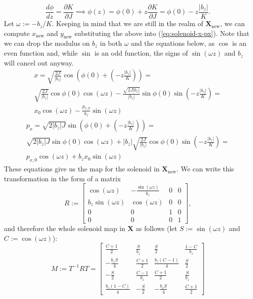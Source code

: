 \[
  \frac{d \phi}{d z} = \frac{\partial K}{\partial J} \implies \phi(z) = \phi(0) + z \frac{\partial K}{\partial J} = \phi(0) - z\frac{|b_z|}{K}.
\]
Let $\omega := -b_z / K$. Keeping in mind that we are still in the realm of $\mathbf{X}_\text{new}$, we can compute $x_\text{new}$ and $y_\text{new}$ substituting the above into (\ref{eq:solenoid-x-px}).
Note that we can drop the modulus on $b_z$ in both $\omega$ and the equations below, as $\cos$ is an even function and, while $\sin$ is an odd function, the signs of $\sin(\omega z)$ and $b_z$ will cancel out anyway.
\begin{multline*}
  x = \sqrt{\frac{2J}{|b_z|}} \cos\left(\phi(0) + \left(- z\frac{|b_z|}{K}\right)\right) = \\
    \sqrt{\frac{2J}{|b_z|}} \cos\phi(0) \cos(\omega z) - \frac{\sqrt{2J|b_z|}}{|b_z|} \sin\phi(0) \sin\left(- z\frac{|b_z|}{K}\right) = \\
    x_0 \cos(\omega z) - \frac{p_{x,0}}{b_z} \sin(\omega z)
\end{multline*}
\begin{multline*}
  p_x = \sqrt{2 |b_z| J} \sin\left(\phi(0) + \left(- z\frac{|b_z|}{K}\right)\right) = \\
    \sqrt{2 |b_z| J} \sin\phi(0) \cos(\omega z) + |b_z| \sqrt{\frac{2J}{|b_z|}} \cos\phi(0) \sin\left(- z\frac{|b_z|}{K}\right) = \\
    p_{x,0} \cos(\omega z) + b_z x_0 \sin(\omega z)
\end{multline*}
These equations give us the map for the solenoid in $\mathbf{X}_\text{new}$.
We can write this transformation in the form of a matrix
\[
R := \begin{bmatrix}
  \cos(\omega z) & -\frac{\sin(\omega z)}{b_z} & 0 & 0 \\
  b_z \sin(\omega z) & \cos(\omega z) & 0 & 0 \\
  0 & 0 & 1 & 0 \\
  0 & 0 & 0 & 1
\end{bmatrix},
\]
and therefore the whole solenoid map in $\mathbf{X}$ as follows (let $S := \sin(\omega z)$ and $C := \cos(\omega z)$):
\[
  M := T^{-1} R T = \begin{bmatrix}
    \frac{C + 1}{2} &
    \frac{S}{b_z} &
    \frac{S}{2} &
    \frac{1 - C}{b_z} \\[6pt]
    -\frac{b_z S}{4} &
    \frac{C + 1}{2} &
    \frac{b_z (C - 1)}{4} &
    \frac{S}{2} \\[6pt]
    -\frac{S}{2} &
    \frac{C - 1}{b_z} &
    \frac{C + 1}{2} &
    \frac{S}{b_z} \\[6pt]
    \frac{b_z (1 - C)}{4} &
    -\frac{S}{2} &
    -\frac{b_z S}{4} &
    \frac{C + 1}{2}
  \end{bmatrix}
\]

